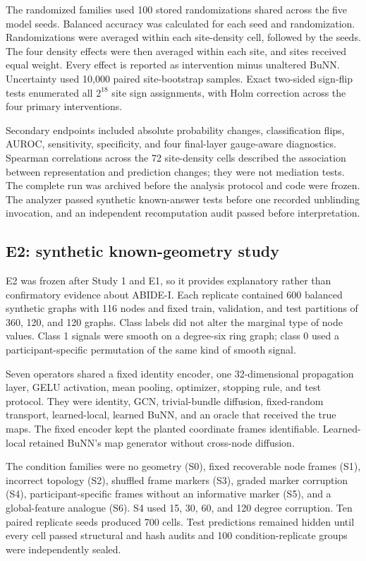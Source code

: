 \documentclass[11pt,a4paper]{article}
\begin{document}
The randomized families used 100 stored randomizations shared across the five
model seeds. Balanced accuracy was calculated for each seed and randomization.
Randomizations were averaged within each site-density cell, followed by the
seeds. The four density effects were then averaged within each site, and sites
received equal weight. Every effect is reported as intervention minus
unaltered BuNN. Uncertainty used 10,000 paired site-bootstrap samples. Exact
two-sided sign-flip tests enumerated all $2^{18}$ site sign assignments, with
Holm correction across the four primary interventions.

Secondary endpoints included absolute probability changes, classification
flips, AUROC, sensitivity, specificity, and four final-layer gauge-aware
diagnostics. Spearman correlations across the 72 site-density cells described
the association between representation and prediction changes; they were not
mediation tests. The complete run was archived before the analysis protocol
and code were frozen. The analyzer passed synthetic known-answer tests before
one recorded unblinding invocation, and an independent recomputation audit
passed before interpretation.

\subsection{E2: synthetic known-geometry study}

E2 was frozen after Study 1 and E1, so it provides explanatory rather than
confirmatory evidence about ABIDE-I. Each replicate contained 600 balanced
synthetic graphs with 116 nodes and fixed train, validation, and test partitions
of 360, 120, and 120 graphs. Class labels did not alter the marginal type of
node values. Class 1 signals were smooth on a degree-six ring graph; class 0
used a participant-specific permutation of the same kind of smooth signal.

Seven operators shared a fixed identity encoder, one 32-dimensional propagation
layer, GELU activation, mean pooling, optimizer, stopping rule, and test
protocol. They were identity, GCN, trivial-bundle diffusion, fixed-random
transport, learned-local, learned BuNN, and an oracle that received the true
maps. The fixed encoder kept the planted coordinate frames identifiable.
Learned-local retained BuNN's map generator without cross-node diffusion.

The condition families were no geometry (S0), fixed recoverable node frames
(S1), incorrect topology (S2), shuffled frame markers (S3), graded marker
corruption (S4), participant-specific frames without an informative marker
(S5), and a global-feature analogue (S6). S4 used 15, 30, 60, and 120 degree
corruption. Ten
paired replicate seeds produced 700 cells. Test predictions remained hidden
until every cell passed structural and hash audits and 100 condition-replicate
groups were independently sealed.
\end{document}
